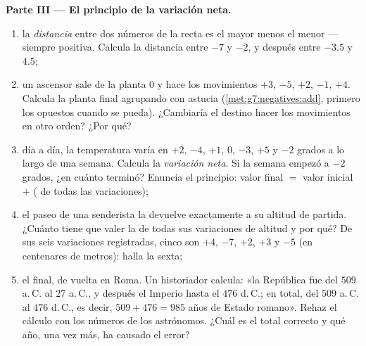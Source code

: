 \begin{problem}
\medskip
\noindent\textbf{Parte III --- El principio de la variación neta.}
\begin{enumerate}[resume]
  \item la \emph{distancia} entre dos números de la recta es
        el mayor menos el menor --- siempre positiva.
        Calcula la distancia entre $-7$ y $-2$, y después entre
        $-3.5$ y $4.5$;
  \item un ascensor sale de la planta $0$ y hace los movimientos $+3$,
        $-5$, $+2$, $-1$, $+4$. Calcula la planta final
        agrupando con astucia (\cref{met:g7:negatives:add},
        primero los opuestos cuando se pueda). ¿Cambiaría el destino hacer
        los movimientos en otro orden? ¿Por qué?
  \item día a día, la temperatura varía en $+2$, $-4$, $+1$,
        $0$, $-3$, $+5$ y $-2$ grados a lo largo de una semana. Calcula la
        \emph{variación neta}. Si la semana empezó a $-2$ grados,
        ¿en cuánto terminó? Enuncia el principio: valor final $=$
        valor inicial $+$ ( de todas las variaciones);
  \item el paseo de una senderista la devuelve exactamente a su altitud
        de partida. ¿Cuánto tiene que valer la  de todas sus variaciones de altitud
        y por qué? De sus seis variaciones registradas, cinco son
        $+4$, $-7$, $+2$, $+3$ y $-5$ (en centenares de metros):
        halla la sexta;
  \item el final, de vuelta en Roma. Un historiador calcula: «la
        República fue del $509$ a.\,C. al $27$ a.\,C., y después el Imperio
        hasta el $476$ d.\,C.; en total, del $509$ a.\,C. al $476$ d.\,C., es decir,
        $509 + 476 = 985$ años de Estado romano». Rehaz el
        cálculo con los números de los astrónomos. ¿Cuál es el
        total correcto y qué año, una vez más, ha causado el
        error?
\end{enumerate}
\end{problem}
